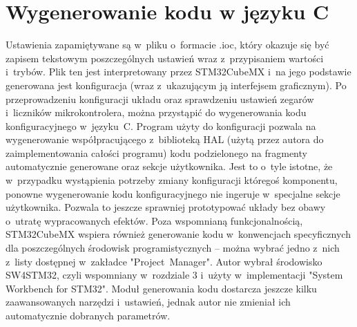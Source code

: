 \section{Wygenerowanie kodu w języku C}
\label{sec:configGenerate}
Ustawienia zapamiętywane są w~pliku o~formacie .ioc, który okazuje się być zapisem tekstowym poszczególnych ustawień wraz z~przypisaniem wartości i~trybów. Plik ten jest interpretowany przez STM32CubeMX i~na jego podstawie generowana jest konfiguracja (wraz z~ukazującym ją interfejsem graficznym). Po przeprowadzeniu konfiguracji układu oraz sprawdzeniu ustawień zegarów i~liczników mikrokontrolera, można przystąpić do wygenerowania kodu konfiguracyjnego w~języku~C. Program użyty do konfiguracji pozwala na wygenerowanie współpracującego z~biblioteką HAL (użytą przez autora do zaimplementowania całości programu) kodu podzielonego na fragmenty automatycznie generowane oraz sekcje użytkownika. Jest to o~tyle istotne, że w~przypadku wystąpienia potrzeby zmiany konfiguracji któregoś komponentu, ponowne wygenerowanie kodu konfiguracyjnego nie ingeruje w~specjalne sekcje użytkownika. Pozwala to jeszcze sprawniej prototypować układy bez obawy o~utratę wypracowanych efektów. Poza wspomnianą funkcjonalnością, STM32CubeMX wspiera również generowanie kodu w~konwencjach specyficznych dla poszczególnych środowisk programistycznych -- można wybrać jedno z~nich z~listy dostępnej w~zakładce "Project~Manager". Autor wybrał środowisko SW4STM32, czyli wspomniany w~rozdziale 3 i~użyty w~implementacji "System Workbench for STM32". Moduł generowania kodu dostarcza jeszcze kilku zaawansowanych narzędzi i~ustawień, jednak autor nie zmieniał ich automatycznie dobranych parametrów.